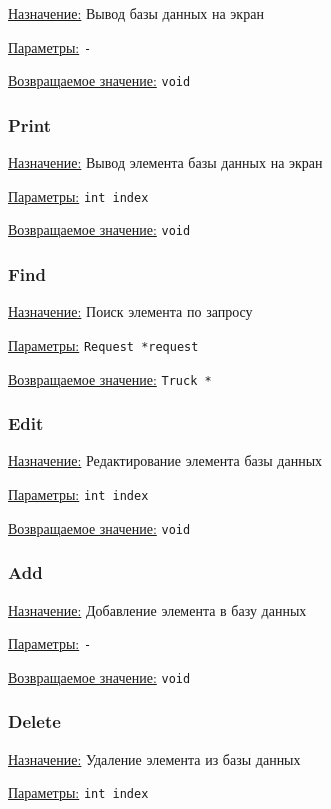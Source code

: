 \underline{Назначение:} Вывод базы данных на экран

\underline{Параметры:} \verb|-|

\underline{Возвращаемое значение:} \verb|void|


\subsubsection*{Print}

\underline{Назначение:} Вывод элемента базы данных на экран

\underline{Параметры:} \verb|int index|

\underline{Возвращаемое значение:} \verb|void|


\subsubsection*{Find}

\underline{Назначение:} Поиск элемента по запросу

\underline{Параметры:} \verb|Request *request|

\underline{Возвращаемое значение:} \verb|Truck *|


\subsubsection*{Edit}

\underline{Назначение:} Редактирование элемента базы данных

\underline{Параметры:} \verb|int index|

\underline{Возвращаемое значение:} \verb|void|


\subsubsection*{Add}

\underline{Назначение:} Добавление элемента в базу данных

\underline{Параметры:} \verb|-|

\underline{Возвращаемое значение:} \verb|void|


\subsubsection*{Delete}

\underline{Назначение:} Удаление элемента из базы данных

\underline{Параметры:} \verb|int index|

